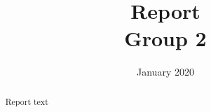 \documentclass[12pt]{article}
\title{Report \\ Group 2}
\date{January 2020}
\begin{document}
\begin{titlepage}
    \begin{center}
        \vspace*{-2cm}\hspace*{1cm}
 
        \vspace{2.5cm}


        {\let\newpage\relax\maketitle}
        \thispagestyle{empty}

        \vspace{0.8cm}

        \begin{minipage}{.8\textwidth}
        \begin{abstract}
            Report text
        \end{abstract}
        \end{minipage}

    \end{center}
\end{titlepage}


\newpage

\setcounter{tocdepth}{2}
\tableofcontents
\newpage

\begin{comment}
\begin{verbatim}
\end{verbatim}
\end{comment}




\end{document}
